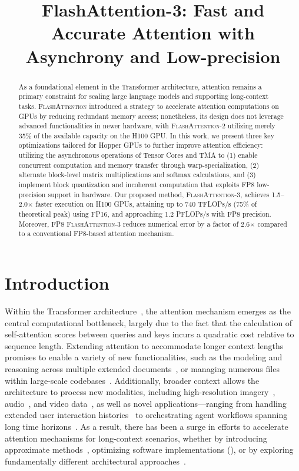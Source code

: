 \title{FlashAttention-3: Fast and Accurate Attention with Asynchrony and Low-precision}

\begin{abstract}
As a foundational element in the Transformer architecture, attention remains a primary constraint for scaling large language models and supporting long-context tasks. \textsc{FlashAttention} introduced a strategy to accelerate attention computations on GPUs by reducing redundant memory access; nonetheless, its design does not leverage advanced functionalities in newer hardware, with \textsc{FlashAttention-2} utilizing merely 35\% of the available capacity on the H100 GPU. In this work, we present three key optimizations tailored for Hopper GPUs to further improve attention efficiency: utilizing the asynchronous operations of Tensor Cores and TMA to (1) enable concurrent computation and memory transfer through warp-specialization, (2) alternate block-level matrix multiplications and softmax calculations, and (3) implement block quantization and incoherent computation that exploits FP8 low-precision support in hardware. Our proposed method, \textsc{FlashAttention-3}, achieves 1.5–2.0$\times$ faster execution on H100 GPUs, attaining up to 740 TFLOPs/s (75\% of theoretical peak) using FP16, and approaching 1.2 PFLOPs/s with FP8 precision. Moreover, FP8 \textsc{FlashAttention-3} reduces numerical error by a factor of 2.6$\times$ compared to a conventional FP8-based attention mechanism.
\end{abstract}

\section{Introduction}
\label{sec:intro}

Within the Transformer architecture~\citep{vaswani2017attention}, the attention mechanism emerges as the central computational bottleneck, largely due to the fact that the calculation of self-attention scores between queries and keys incurs a quadratic cost relative to sequence length. Extending attention to accommodate longer context lengths promises to enable a variety of new functionalities, such as the modeling and reasoning across multiple extended documents~\citep{guo2021longt5,shaham2022scrolls,peng2023yarn}, or managing numerous files within large-scale codebases~\citep{roziere2023code, li2023starcoder}. Additionally, broader context allows the architecture to process new modalities, including high-resolution imagery~\citep{chen2022scaling}, audio~\citep{gulati2020conformer}, and video data~\citep{ho2022video}, as well as novel applications—ranging from handling extended user interaction histories~\citep{sun2019bert4rec} to orchestrating agent workflows spanning long time horizons~\citep{yao2022react}. As a result, there has been a surge in efforts to accelerate attention mechanisms for long-context scenarios, whether by introducing approximate methods~\citep{katharopoulos2020transformers,choromanski2020rethinking, tay2020efficient}, optimizing software implementations (\citep{rabe2021self,dao2022flashattention,kwon2023efficient}), or by exploring fundamentally different architectural approaches~\citep{peng2023rwkv,sun2023retentive,gu2023mamba}.

